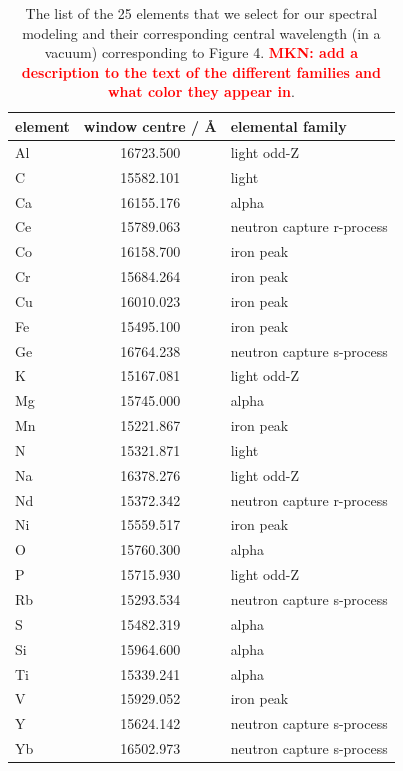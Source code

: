 \documentclass[a4paper,fleqn,usenatbib]{mnras}
\newcommand{\mkn}[1]{\textbf{\textcolor{red}{MKN: #1}}}
\begin{document}
\begin{table}
    \centering
    \caption{The list of the 25 elements that we select for our spectral modeling and their corresponding central wavelength (in a vacuum) corresponding to Figure 4. \mkn{add a description to the text of the different families and what color they appear in}.}
    \label{tab:window_centres}
    \begin{tabular}{lcl}
        \hline
        element & window centre / \AA & elemental family \\
        \hline
        Al & 16723.500 & light odd-Z \\
        C & 15582.101 & light \\
        Ca & 16155.176 & alpha \\
        Ce & 15789.063 & neutron capture r-process \\
        Co & 16158.700 & iron peak \\
        Cr & 15684.264 & iron peak \\
        Cu & 16010.023 & iron peak \\
        Fe & 15495.100 & iron peak \\
        Ge & 16764.238 & neutron capture s-process \\
        K & 15167.081 & light odd-Z \\
        Mg & 15745.000 & alpha \\
        Mn & 15221.867 & iron peak \\
        N & 15321.871 & light \\
        Na & 16378.276 & light odd-Z \\
        Nd & 15372.342 & neutron capture r-process \\
        Ni & 15559.517 & iron peak \\
        O & 15760.300 & alpha \\
        P & 15715.930 & light odd-Z \\
        Rb & 15293.534 & neutron capture s-process \\
        S & 15482.319 & alpha \\
        Si & 15964.600 & alpha \\
        Ti & 15339.241 & alpha \\
        V & 15929.052 & iron peak \\
        Y & 15624.142 & neutron capture s-process \\
        Yb & 16502.973 & neutron capture s-process \\
        \hline
    \end{tabular}
\end{table}
\end{document}
